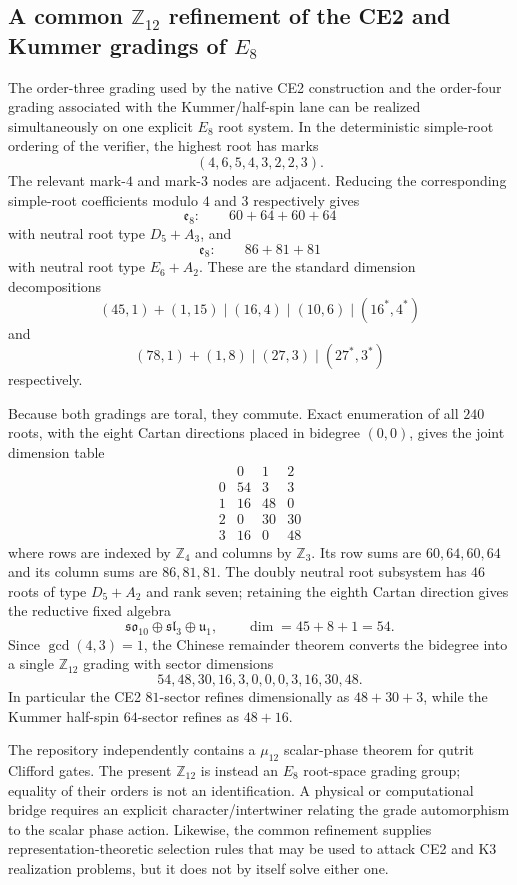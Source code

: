 \subsection{A common $\mathbb Z_{12}$ refinement of the CE2 and Kummer gradings of $E_8$}
\label{subsec:e8-z12-common-refinement}

The order-three grading used by the native CE2 construction and the order-four grading
associated with the Kummer/half-spin lane can be realized simultaneously on one explicit
$E_8$ root system.  In the deterministic simple-root ordering of the verifier, the highest
root has marks
\[
 (4,6,5,4,3,2,2,3).
\]
The relevant mark-$4$ and mark-$3$ nodes are adjacent.  Reducing the corresponding
simple-root coefficients modulo $4$ and $3$ respectively gives
\[
 \mathfrak e_8:\qquad 60+64+60+64
\]
with neutral root type $D_5+A_3$, and
\[
 \mathfrak e_8:\qquad 86+81+81
\]
with neutral root type $E_6+A_2$.  These are the standard dimension decompositions
\[
 (45,1)+(1,15)\mid(16,4)\mid(10,6)\mid(16^*,4^*)
\]
and
\[
 (78,1)+(1,8)\mid(27,3)\mid(27^*,3^*)
\]
respectively.

Because both gradings are toral, they commute.  Exact enumeration of all $240$ roots,
with the eight Cartan directions placed in bidegree $(0,0)$, gives the joint dimension
table
\[
 \boxed{
 \begin{array}{c|ccc}
  &0&1&2\\\hline
 0&54&3&3\\
 1&16&48&0\\
 2&0&30&30\\
 3&16&0&48
 \end{array}}
\]
where rows are indexed by $\mathbb Z_4$ and columns by $\mathbb Z_3$.  Its row sums are
$60,64,60,64$ and its column sums are $86,81,81$.  The doubly neutral root subsystem has
$46$ roots of type $D_5+A_2$ and rank seven; retaining the eighth Cartan direction gives
the reductive fixed algebra
\[
 \boxed{\mathfrak{so}_{10}\oplus\mathfrak{sl}_3\oplus\mathfrak u_1},
 \qquad \dim=45+8+1=54.
\]
Since $\gcd(4,3)=1$, the Chinese remainder theorem converts the bidegree into a single
$\mathbb Z_{12}$ grading with sector dimensions
\[
 \boxed{54,48,30,16,3,0,0,0,3,16,30,48}.
\]
In particular the CE2 $81$-sector refines dimensionally as $48+30+3$, while the
Kummer half-spin $64$-sector refines as $48+16$.

The repository independently contains a $\mu_{12}$ scalar-phase theorem for qutrit
Clifford gates.  The present $\mathbb Z_{12}$ is instead an $E_8$ root-space grading group;
equality of their orders is not an identification.  A physical or computational bridge
requires an explicit character/intertwiner relating the grade automorphism to the scalar
phase action.  Likewise, the common refinement supplies representation-theoretic selection
rules that may be used to attack CE2 and K3 realization problems, but it does not by itself
solve either one.
